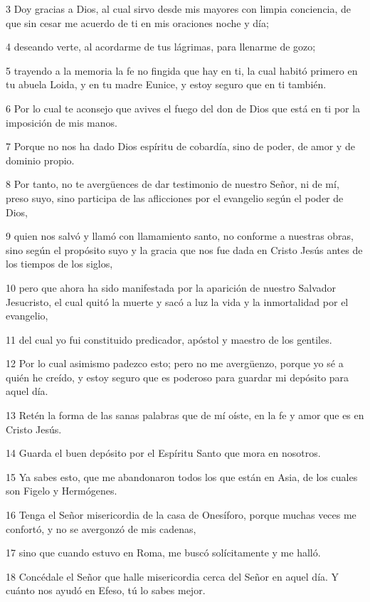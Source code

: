 \par 3 Doy gracias a Dios, al cual sirvo desde mis mayores con limpia conciencia, de que sin cesar me acuerdo de ti en mis oraciones noche y día;
\par 4 deseando verte, al acordarme de tus lágrimas, para llenarme de gozo;
\par 5 trayendo a la memoria la fe no fingida que hay en ti, la cual habitó primero en tu abuela Loida, y en tu madre Eunice, y estoy seguro que en ti también.
\par 6 Por lo cual te aconsejo que avives el fuego del don de Dios que está en ti por la imposición de mis manos.
\par 7 Porque no nos ha dado Dios espíritu de cobardía, sino de poder, de amor y de dominio propio.
\par 8 Por tanto, no te avergüences de dar testimonio de nuestro Señor, ni de mí, preso suyo, sino participa de las aflicciones por el evangelio según el poder de Dios,
\par 9 quien nos salvó y llamó con llamamiento santo, no conforme a nuestras obras, sino según el propósito suyo y la gracia que nos fue dada en Cristo Jesús antes de los tiempos de los siglos,
\par 10 pero que ahora ha sido manifestada por la aparición de nuestro Salvador Jesucristo, el cual quitó la muerte y sacó a luz la vida y la inmortalidad por el evangelio,
\par 11 del cual yo fui constituido predicador, apóstol y maestro de los gentiles.
\par 12 Por lo cual asimismo padezco esto; pero no me avergüenzo, porque yo sé a quién he creído, y estoy seguro que es poderoso para guardar mi depósito para aquel día.
\par 13 Retén la forma de las sanas palabras que de mí oíste, en la fe y amor que es en Cristo Jesús.
\par 14 Guarda el buen depósito por el Espíritu Santo que mora en nosotros.
\par 15 Ya sabes esto, que me abandonaron todos los que están en Asia, de los cuales son Figelo y Hermógenes.
\par 16 Tenga el Señor misericordia de la casa de Onesíforo, porque muchas veces me confortó, y no se avergonzó de mis cadenas,
\par 17 sino que cuando estuvo en Roma, me buscó solícitamente y me halló.
\par 18 Concédale el Señor que halle misericordia cerca del Señor en aquel día. Y cuánto nos ayudó en Efeso, tú lo sabes mejor.

